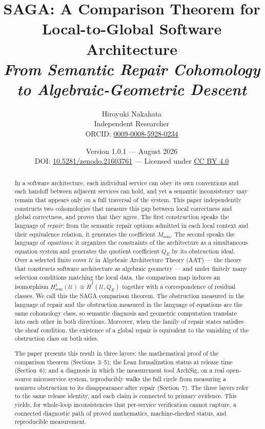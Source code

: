 \documentclass[11pt]{article}
\title{\textbf{SAGA: A Comparison Theorem for Local-to-Global Software Architecture}\\[0.6em]
\large\itshape From Semantic Repair Cohomology to Algebraic-Geometric Descent}
\author{Hiroyuki Nakahata\\
\normalsize Independent Researcher\\
\normalsize ORCID: \href{https://orcid.org/0009-0008-5928-0234}{0009-0008-5928-0234}}
\date{\normalsize Version 1.0.1 --- August 2026\\
\normalsize DOI: \href{https://doi.org/10.5281/zenodo.21603761}{10.5281/zenodo.21603761}
--- Licensed under \href{https://creativecommons.org/licenses/by/4.0/}{CC BY 4.0}}
\theoremstyle{plain}
\theoremstyle{definition}
\newcommand{\cU}{\mathcal{U}}
\newcommand{\Msem}{M_{\mathrm{sem}}}
\newcommand{\QE}{Q_{E}}
\begin{document}
\maketitle

\begin{abstract}
In a software architecture, each individual service can obey its own
conventions and each handoff between adjacent services can hold, and yet a
semantic inconsistency may remain that appears only on a full traversal
of the system. This paper independently constructs two cohomologies
that measure this gap between local correctness and global correctness, and
proves that they agree. The first construction speaks the language of
\emph{repair}: from the semantic repair options admitted in each local
context and their equivalence relation, it generates the coefficient
$\Msem$. The second speaks the language of \emph{equations}: it organizes
the constraints of the architecture as a simultaneous equation system and
generates the quotient coefficient $\QE$ by its obstruction ideal. Over a
selected finite cover $\cU$ in Algebraic Architecture Theory (AAT) --- the
theory that constructs software architecture as algebraic geometry --- and
under finitely many selection conditions matching the local data, the
comparison map induces an isomorphism
$H^1_{\mathrm{sem}}(\cU)\cong\check{H}^1(\cU,\QE)$ together with a
correspondence of residual classes. We call this the SAGA comparison
theorem. The obstruction measured in the language of repair and the
obstruction measured in the language of equations are the same cohomology
class, so semantic diagnosis and geometric computation translate into each
other in both directions. Moreover, when the family of repair states
satisfies the sheaf condition, the existence of a global repair is
equivalent to the vanishing of the obstruction class on both sides.

The paper presents this result in three layers: the mathematical proof of
the comparison theorem (Sections~3--5); the Lean formalization status at
release time (Section~6); and a diagnosis in which the measurement tool
ArchSig, on a real open-source microservice system, reproducibly walks the
full circle from measuring a nonzero obstruction to its disappearance after
repair (Section~7). The three layers refer to the same release identity,
and each claim is connected to primary evidence. This yields, for
whole-loop inconsistencies that per-service verification cannot capture, a
connected diagnostic path of proved mathematics, machine-checked status,
and reproducible measurement.
\end{abstract}
\end{document}
